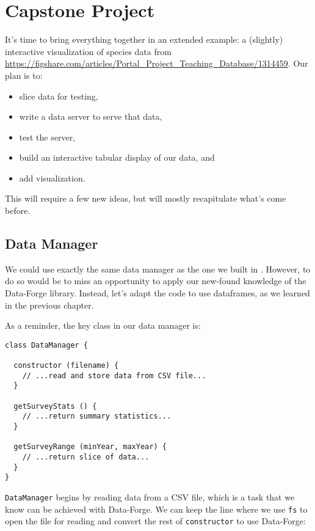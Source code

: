 \chapter{Capstone Project}\label{s:capstone}

It's time to bring everything together in an extended example:
a (slightly) interactive visualization of species data from
\url{https://figshare.com/articles/Portal_Project_Teaching_Database/1314459}.
Our plan is to:

\begin{itemize}
\item
  slice data for testing,
\item
  write a data server to serve that data,
\item
  test the server,
\item
  build an interactive tabular display of our data, and
\item
  add visualization.
\end{itemize}

\noindent
This will require a few new ideas,
but will mostly recapitulate what's come before.

\section{Data Manager}\label{s:capstone-data}

We could use exactly the same data manager
as the one we built in .
However, to do so would be to miss an
opportunity to apply our new-found knowledge
of the Data-Forge library.
Instead, let's adapt the code to use dataframes,
as we learned in the previous chapter.

As a reminder,
the key class in our data manager is:

\begin{verbatim}
class DataManager {

  constructor (filename) {
    // ...read and store data from CSV file...
  }

  getSurveyStats () {
    // ...return summary statistics...
  }

  getSurveyRange (minYear, maxYear) {
    // ...return slice of data...
  }
}
\end{verbatim}

\texttt{DataManager} begins by reading data
from a CSV file,
which is a task that we know can be
achieved with Data-Forge.
We can keep the line where we use \texttt{fs} to open
the file for reading
and convert the rest of \texttt{constructor}
to use Data-Forge:

